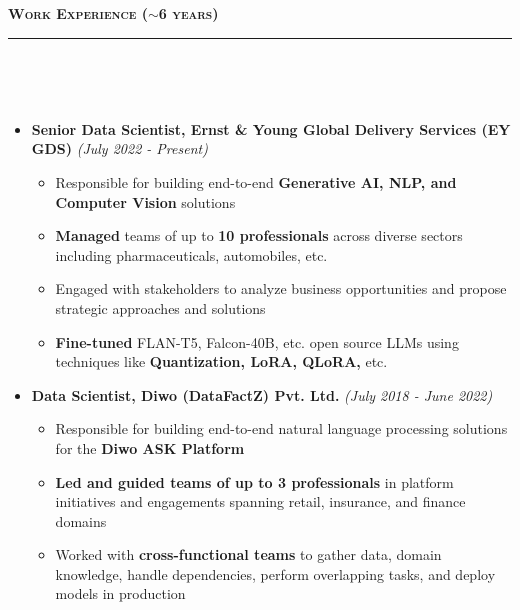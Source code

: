 \documentclass[a4paper,10pt]{article}
\newcommand{\isep}{-2 pt}
\newcommand{\lsep}{-0.5cm}
\newcommand{\resheading}[1]{{\small
        {
            \begin{minipage}
                {0.992\textwidth}\textbf{{\textsc{#1 \vphantom{p\^{E}} }}}
                \\[-0.3cm]
                \hrule
            \end{minipage}
            \\[-0.5cm]
        }
 }}
\begin{document}
\vspace{4pt}
\noindent
\resheading{\textbf{\large Work Experience ($\sim$6 years)}}\\[\lsep]
\vspace{4pt}
\begin{itemize}
    \item \textbf{Senior Data Scientist, Ernst \& Young Global Delivery Services (EY GDS)} \hfill {\emph{(July 2022 - Present)}}
    \\ [-0.6cm]
    \begin{itemize}\itemsep \isep
        \item Responsible for building end-to-end \textbf{Generative AI, NLP, and Computer Vision} solutions
        \item \textbf{Managed} teams of up to \textbf{10 professionals} across diverse sectors including pharmaceuticals, automobiles, etc.
        \item Engaged with stakeholders to analyze business opportunities and propose strategic approaches and solutions
        \item \textbf{Fine-tuned} FLAN-T5, Falcon-40B, etc. open source LLMs using techniques like \textbf{Quantization, LoRA, QLoRA,} etc.
    \\ [-0.5cm]
    \end{itemize}
    
    \item \textbf{Data Scientist, Diwo (DataFactZ) Pvt. Ltd.} \hfill {\emph{(July 2018 - June 2022)}}
    \\ [-0.6cm]
    \begin{itemize}\itemsep \isep
        \item Responsible for building end-to-end natural language processing solutions for the \textbf{Diwo ASK Platform}
        \item \textbf{Led and guided teams of up to 3 professionals} in platform initiatives and engagements spanning retail, insurance, and finance domains
        \item Worked with \textbf{cross-functional teams} to gather data, domain knowledge, handle dependencies, perform overlapping tasks, and deploy models in production  
    \\ [-0.5cm]
    \end{itemize}
    

\end{itemize}
\end{document}
